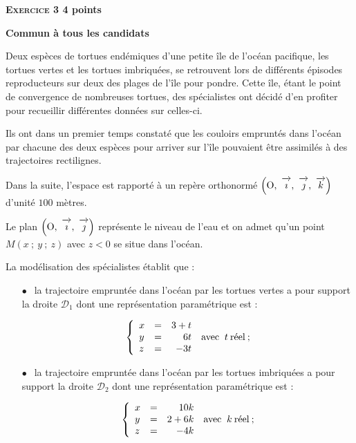 \documentclass[10pt,a4paper]{article}
\newcommand{\vect}[1]{\overrightarrow{\,\mathstrut#1\,}}
\def\Oij{$\left(\text{O},~\vect{\imath},~\vect{\jmath}\right)$}
\def\Oijk{$\left(\text{O},~\vect{\imath},~\vect{\jmath},~\vect{k}\right)$}
\begin{document}
\vspace{0,5cm}

\textbf{\textsc{Exercice 3} \hfill 4 points}

\textbf{Commun à tous les candidats}

\medskip

Deux espèces de tortues endémiques d'une petite île de l'océan pacifique, les tortues vertes et les tortues imbriquées, se retrouvent lors de différents épisodes reproducteurs sur deux des plages de l'île pour pondre. Cette île, étant le point de convergence de nombreuses tortues, des spécialistes ont décidé d'en profiter pour recueillir différentes données sur celles-ci.

\smallskip

Ils ont dans un premier temps constaté que les couloirs empruntés dans l'océan par chacune des deux espèces pour arriver sur l'île pouvaient être assimilés à des trajectoires rectilignes.

Dans la suite, l'espace est rapporté à un repère orthonormé \Oijk{} d'unité $100$ mètres.

Le plan \Oij{} représente le niveau de l'eau et on admet qu'un point $M(x~;~y~;~z)$ avec $z < 0$ se situe dans l'océan.

La modélisation des spécialistes établit que :

\setlength\parindent{8mm}
\begin{itemize}
\item[$\bullet~~$] la trajectoire empruntée dans l'océan par les tortues vertes a pour support la droite $\mathcal{D}_1$ dont une représentation paramétrique est :

\[\left\{\begin{array}{l c r}
x	&=&3+t\\
y 	&=&6t\\
z	&=&- 3t
\end{array}\right.\:\text{avec } \:t\: \text{réel}\: ;\]

\item[$\bullet~~$] la trajectoire empruntée dans l'océan par les tortues imbriquées a pour support la droite $\mathcal{D}_2$ dont une représentation paramétrique est :

\[\left\{\begin{array}{l c r}
x&=&10k\\
y&=&2 + 6k\\ 
z&=&- 4k
\end{array}\right.\:\text{avec } \:k\: \text{réel}\: ;\]
\end{itemize}
\setlength\parindent{0mm}
\end{document}
